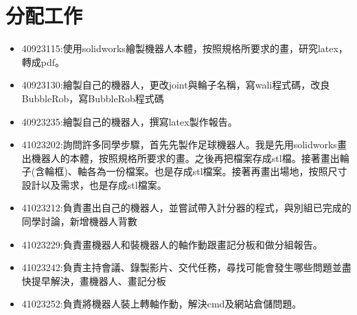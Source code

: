 \chapter{分配工作}
\begin{itemize}
\item 40923115:使用solidworks繪製機器人本體，按照規格所要求的畫，研究latex，轉成pdf。
\item 40923130:繪製自己的機器人，更改joint與輪子名稱，寫wali程式碼，改良BubbleRob，寫BubbleRob程式碼
\item 40923235:繪製自己的機器人，撰寫latex製作報告。
\item 41023202:詢問許多同學步驟，首先先製作足球機器人。我是先用solidworks畫出機器人的本體，按照規格所要求的畫。之後再把檔案存成stl檔。接著畫出輪子(含輪框)、軸各為一份檔案。也是存成stl檔案。接著再畫出場地，按照尺寸設計以及需求，也是存成stl檔案。 
\item 41023212:負責畫出自己的機器人，並嘗試帶入計分器的程式，與別組已完成的同學討論，新增機器人背數 
\item 41023229:負責畫機器人和裝機器人的軸作動跟畫記分板和做分組報告。 
\item 41023242:負責主持會議、錄製影片、交代任務，尋找可能會發生哪些問題並盡快提早解決，畫機器人、畫記分板 
\item 41023252:負責將機器人裝上轉軸作動，解決cmd及網站倉儲問題。 
\end{itemize}
\newpage
